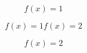 \documentclass{article}
\begin{document}
\begin{test}
  \begin{equation}
    f(x) = 1
  \end{equation}
\end{test}

\begin{subequations}
  \begin{equation}
    f(x) = 1
  \end{equation}
  \begin{equation}
    f(x) = 2
  \end{equation}
\end{subequations}

\begin{equation}
  f(x) = 2
\end{equation}
\end{document}
